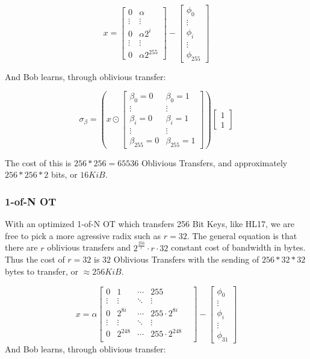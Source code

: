 \documentclass{article}
\begin{document}
$$x =\begin{bmatrix}
0 & \alpha  \\
\vdots & \vdots \\
0 & \alpha 2^{i} \\
\vdots & \vdots \\
0 & \alpha  2^{255} 
\end{bmatrix}- \begin{bmatrix}
\phi_0 \\
\vdots\\
\phi_i\\
\vdots\\
\phi_{255}
\end{bmatrix}$$

And Bob learns, through oblivious transfer:

$$\sigma_{\beta} = 
\left(x \odot \begin{bmatrix}
\beta_0 = 0 & \beta_0 = 1 \\
\vdots & \vdots \\
\beta_i = 0 & \beta_i = 1 \\
\vdots & \vdots \\
\beta_{255} = 0 & \beta_{255} = 1
\end{bmatrix}\right)
\begin{bmatrix}
1 \\ 1
\end{bmatrix}
$$



The cost of this is $256*256 = 65536$ Oblivious Transfers, and approximately $256*256*2$ bits, or $16 KiB$.

\subsubsection{1-of-N OT}

With an optimized 1-of-N OT which transfers 256 Bit Keys, like HL17, we are free to pick a more agressive radix such as $r=32$. The general equation is that there are $r$ oblivious transfers and $2^{\frac{256}{r}}\cdot r \cdot 32$ constant cost of bandwidth in bytes. Thus the cost of $r=32$ is $32$ Oblivious Transfers with the sending of $256*32*32$ bytes to transfer, or $\approx 256 KiB$. 



$$ x = \alpha \begin{bmatrix}
0 & 1& \cdots & 255\\
\vdots & \vdots & \ddots & \vdots &\\
0 & 2^{8i} & \cdots & 255 \cdot 2^{8i}\\
\vdots &\vdots & \ddots & \vdots\\
0 & 2^{248} & \cdots & 255 \cdot 2^{248}\\
\end{bmatrix} - \begin{bmatrix}
\phi_0 \\
\vdots\\
\phi_i\\
\vdots\\
\phi_{31}
\end{bmatrix}
$$
And Bob learns, through oblivious transfer:
\end{document}
